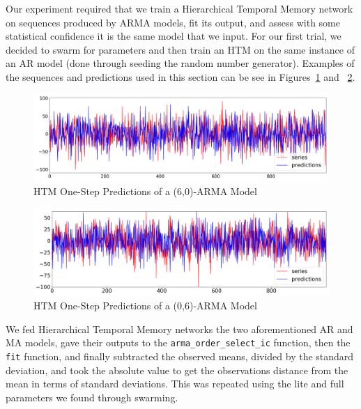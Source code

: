 \documentclass[oneside,12pt,openany]{book}
\begin{document}
	Our experiment required that we train a Hierarchical Temporal Memory network on sequences produced by ARMA models, fit its output, and assess with some statistical confidence it is the same model that we input. For our first trial, we decided to swarm for parameters and then train an HTM on the same instance of an AR model (done through seeding the random number generator). Examples of the sequences and predictions used in this section can be see in Figures~\ref{fig:train(6,0)ARMA} and ~\ref{fig:train(0,6)ARMA}.
    
    \begin{figure}[hbt!]
        \centering
        \includegraphics[width=\linewidth]{images/HTMTraining(6,0)-ARMA.png}
        \caption{HTM One-Step Predictions of a (6,0)-ARMA Model}
        \label{fig:train(6,0)ARMA}
    \end{figure}
    \begin{figure}[hbt!]
        \centering
        \includegraphics[width=\linewidth]{images/HTMTraining(0,6)-ARMA.png}
        \caption{HTM One-Step Predictions of a (0,6)-ARMA Model}
        \label{fig:train(0,6)ARMA}
    \end{figure}
    \FloatBarrier
    
    
    We fed Hierarchical Temporal Memory networks the two aforementioned AR and MA models, gave their outputs to the \texttt{arma\_order\_select\_ic} function, then the \texttt{fit} function, and finally subtracted the observed means, divided by the standard deviation, and took the absolute value to get the observations distance from the mean in terms of standard deviations.  This was repeated using the lite and full parameters we found through swarming.
   
\end{document}
